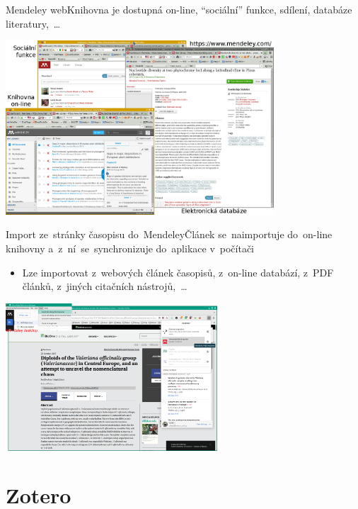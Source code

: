 \documentclass[compress, xelatex, 11pt, xcolor=svgnames, aspectratio=169,
	hyperref={
		bookmarks=true,
		unicode=true,
		colorlinks=true,
		pdftitle={Citacni software},
		plainpages=false,
		pdfauthor={Vojtech Zeisek},
		pdfsubject={Kratky uvod do citacniho software},
		pdfcreator={XeLaTeX},
		pdfkeywords={citace, reference, software, literatura},
		linkcolor=Crimson, %
		anchorcolor=Magenta, %
		citecolor=Magenta, %
		filecolor=Magenta, %
		menucolor=Magenta, %
		urlcolor=DarkTurquoise, %
		},
	url={hyphens, lowtilde} %
	]{beamer}
\begin{document}
\begin{frame}{Mendeley web}{Knihovna je dostupná on-line, \enquote{sociální} funkce, sdílení, databáze literatury,~\ldots}
        \begin{center}
                \includegraphics[height=6.5cm]{mendeley_web.png}
        \end{center}
\end{frame}

\begin{frame}{Import ze~stránky časopisu do~Mendeley}{Článek se~naimportuje do~on-line knihovny a~z~ní~se~synchronizuje do~aplikace v~počítači}
	\begin{itemize}
		\item Lze importovat z~webových článek časopisů, z~on-line databází, z~PDF článků, z~jiných citačních nástrojů,~\ldots
	\end{itemize}
	\begin{center}
		\includegraphics[height=5.5cm]{mendeley_web_import.png}
	\end{center}
\end{frame}

\section{Zotero}
\end{document}
